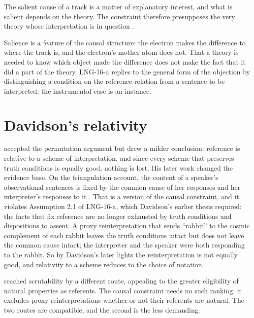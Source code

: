 \documentclass{situationist-preprint}
\begin{document}
\begin{objection}
The salient cause of a track is a matter of explanatory interest, and what is salient depends on the theory. The constraint therefore presupposes the very theory whose interpretation is in question \citep{Putnam1980}.
\end{objection}

\begin{reply}
Salience is a feature of the causal structure: the electron makes the difference to where the track is, and the electron's mother atom does not. That a theory is needed to know which object made the difference does not make the fact that it did a part of the theory. LNG-16-a replies to the general form of the objection by distinguishing a condition on the reference relation from a sentence to be interpreted; the instrumental case is an instance.
\end{reply}

\section{Davidson's relativity}

\citet{Davidson1979} accepted the permutation argument but drew a milder conclusion: reference is relative to a scheme of interpretation, and since every scheme that preserves truth conditions is equally good, nothing is lost. His later work changed the evidence base. On the triangulation account, the content of a speaker's observational sentences is fixed by the common cause of her responses and her interpreter's responses to it \citep{Davidson2001}. That is a version of the causal constraint, and it violates Assumption 2.1 of LNG-16-a, which Davidson's earlier thesis required: the facts that fix reference are no longer exhausted by truth conditions and dispositions to assent. A proxy reinterpretation that sends \enquote{rabbit} to the cosmic complement of each rabbit leaves the truth conditions intact but does not leave the common cause intact; the interpreter and the speaker were both responding to the rabbit. So by Davidson's later lights the reinterpretation is not equally good, and relativity to a scheme reduces to the choice of notation.

\citet{Lewis1984} reached scrutability by a different route, appealing to the greater eligibility of natural properties as referents. The causal constraint needs no such ranking: it excludes proxy reinterpretations whether or not their referents are natural. The two routes are compatible, and the second is the less demanding.
\end{document}
